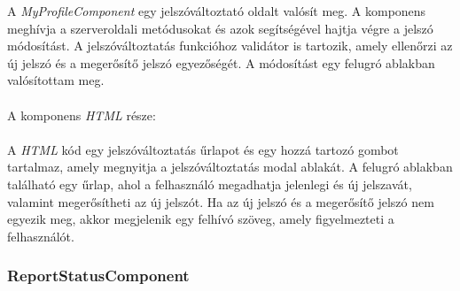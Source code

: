 A \textit{MyProfileComponent} egy jelszóváltoztató oldalt valósít meg. A komponens meghívja a szerveroldali metódusokat és azok segítségével hajtja végre a jelszó módosítást. A jelszóváltoztatás funkcióhoz validátor is tartozik, amely ellenőrzi az új jelszó és a megerősítő jelszó egyezőségét. A módosítást egy felugró ablakban valósítottam meg.\\
\\
A komponens \textit{HTML} része:\\
\\
A \textit{HTML} kód egy jelszóváltoztatás űrlapot és egy hozzá tartozó gombot tartalmaz, amely megnyitja a jelszóváltoztatás modal ablakát. A felugró ablakban található egy űrlap, ahol a felhasználó megadhatja jelenlegi és új jelszavát, valamint megerősítheti az új jelszót. Ha az új jelszó és a megerősítő jelszó nem egyezik meg, akkor megjelenik egy felhívó szöveg, amely figyelmezteti a felhasználót.


\subsubsection{ReportStatusComponent}

